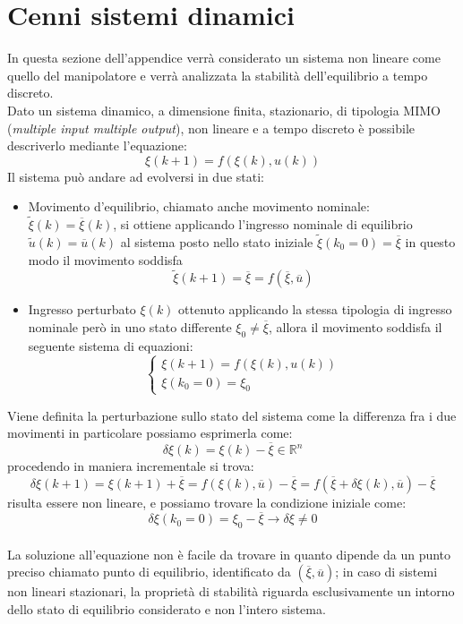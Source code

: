 \section{Cenni sistemi dinamici}
In questa sezione dell'appendice  verrà considerato un sistema non lineare come quello del manipolatore e verrà analizzata la stabilità dell'equilibrio a tempo discreto.
\\Dato un sistema dinamico, a dimensione finita, stazionario, di tipologia MIMO (\textit{multiple input multiple output}), non lineare e a tempo discreto è possibile descriverlo mediante l'equazione:
\begin{equation}
\xi(k+1) = f(\xi(k),u(k))
\end{equation}
Il sistema può andare ad evolversi in due stati:
\begin{itemize}
\item Movimento d'equilibrio, chiamato anche movimento nominale: $\tilde{\xi}(k) = \overline{\xi}(k)$, si ottiene applicando l'ingresso nominale di equilibrio $\tilde{u}(k) = \overline{u}(k)$ al sistema posto nello stato iniziale $\tilde{\xi}(k_0 = 0)=\overline{\xi}$ in questo modo il movimento soddisfa
\begin{equation}
\tilde{\xi}(k+1) = \overline{\xi} = f(\overline{\xi},\overline{u})
\end{equation}
\item Ingresso perturbato $\xi(k)$ ottenuto applicando la stessa tipologia di ingresso nominale però in uno stato differente $\xi_0 \neq \overline{\xi}$, allora il movimento soddisfa il seguente sistema di equazioni:
\begin{equation}
\begin{cases}
\xi(k+1) = f(\xi(k),u(k)) \\
\xi(k_0=0) = \xi_0
\end{cases}
\end{equation}
\end{itemize}
Viene definita la perturbazione sullo stato del sistema come la differenza fra i due movimenti in particolare possiamo esprimerla come:
\begin{equation}
\delta \xi(k) = \xi(k)-\overline{\xi} \in \mathbb{R}^n 
\end{equation}
procedendo in maniera incrementale si trova:
\begin{equation}
\delta \xi(k+1) = \xi(k+1)+\overline{\xi} = f(\xi(k),\overline{u})-\overline{\xi} = f(\overline{\xi}+\delta\xi(k),\overline{u})-\overline{\xi}
\end{equation}
risulta essere non lineare, e possiamo trovare la condizione iniziale come:
\begin{equation*} 
\delta \xi(k_0 = 0) = \xi_0 -\overline{\xi} \rightarrow \delta \xi \neq 0
\end{equation*}
\\La soluzione all'equazione non è facile da trovare in quanto dipende da un punto preciso chiamato punto di equilibrio, identificato da $(\overline{\xi},\overline{u})$; in caso di sistemi non lineari stazionari, la proprietà di stabilità riguarda esclusivamente un intorno dello stato di equilibrio considerato e non l'intero sistema.
